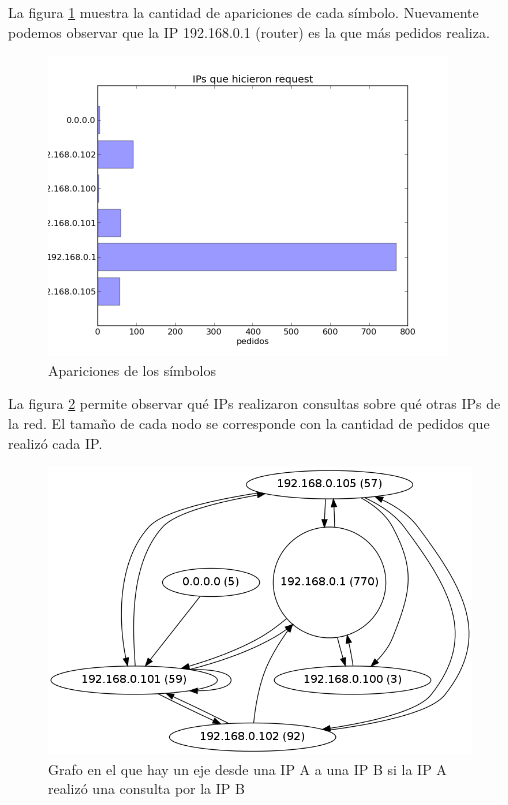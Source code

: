 \documentclass{article}
\begin{document}
La figura \ref{fig:red2requesters:count} muestra la cantidad de apariciones de
cada símbolo. Nuevamente podemos observar que la IP 192.168.0.1 (router) es la que más pedidos realiza.

\begin{figure}[h!]
    \centering                                                       
    \includegraphics[width=300pt]{red2/red2requesters.png}
    \caption{Apariciones de los símbolos}
    \label{fig:red2requesters:count}
\end{figure}

La figura \ref{fig:red2requesters:graph} permite observar qué IPs realizaron
consultas sobre qué otras IPs de la red. El tamaño de cada nodo se corresponde
con la cantidad de pedidos que realizó cada IP.

\begin{figure}[h!]
    \centering
    \includegraphics[width=350pt]{red2/red2requestersgraph.png}
    \caption{Grafo en el que hay un eje desde una IP A a una IP B si la IP A
        realizó una consulta por la IP B}
    \label{fig:red2requesters:graph}
\end{figure}
\end{document}
